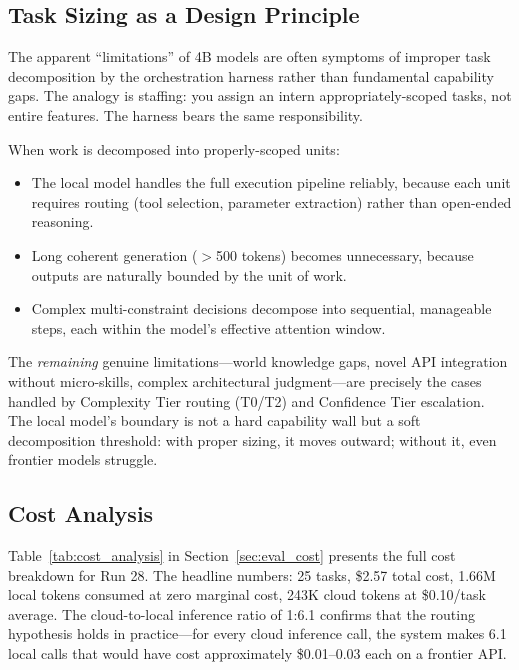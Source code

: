 \documentclass{article}
\begin{document}
\subsection{Task Sizing as a Design Principle}
\label{sec:task_sizing}

The apparent ``limitations'' of 4B models are often symptoms of improper task decomposition by the orchestration harness rather than fundamental capability gaps.
The analogy is staffing: you assign an intern appropriately-scoped tasks, not entire features.
The harness bears the same responsibility.

When work is decomposed into properly-scoped units:
\begin{itemize}[leftmargin=*]
\item The local model handles the full execution pipeline reliably, because each unit requires routing (tool selection, parameter extraction) rather than open-ended reasoning.
\item Long coherent generation ($>$500 tokens) becomes unnecessary, because outputs are naturally bounded by the unit of work.
\item Complex multi-constraint decisions decompose into sequential, manageable steps, each within the model's effective attention window.
\end{itemize}

The \emph{remaining} genuine limitations---world knowledge gaps, novel API integration without micro-skills, complex architectural judgment---are precisely the cases handled by Complexity Tier routing (T0/T2) and Confidence Tier escalation.
The local model's boundary is not a hard capability wall but a soft decomposition threshold: with proper sizing, it moves outward; without it, even frontier models struggle.

\subsection{Cost Analysis}
\label{sec:cost_numbers}

Table~\ref{tab:cost_analysis} in Section~\ref{sec:eval_cost} presents the full cost breakdown for Run 28.
The headline numbers: 25 tasks, \$2.57 total cost, 1.66M local tokens consumed at zero marginal cost, 243K cloud tokens at \$0.10/task average.
The cloud-to-local inference ratio of 1:6.1 confirms that the routing hypothesis holds in practice---for every cloud inference call, the system makes 6.1 local calls that would have cost approximately \$0.01--0.03 each on a frontier API.
\end{document}
